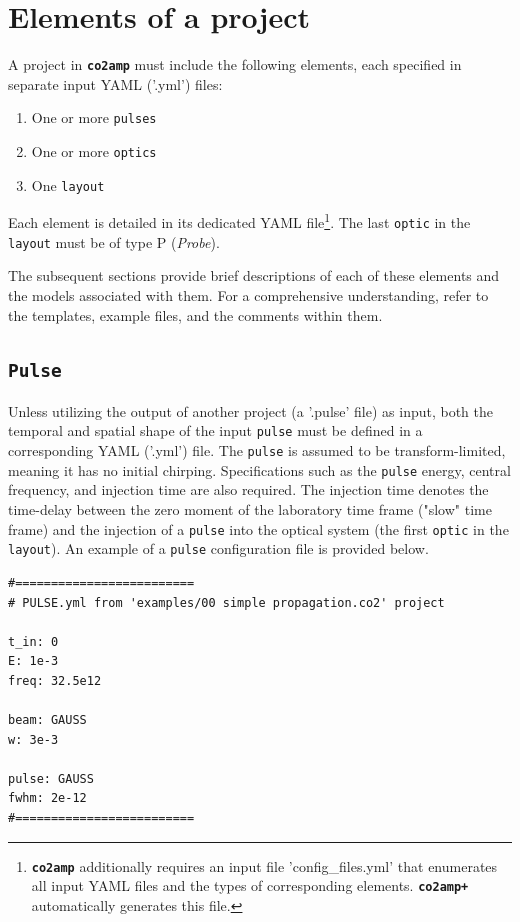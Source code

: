 \chapter{Elements of a project}

A project in \textbf{\texttt{co2amp}} must include the following elements, each specified in separate input YAML ('.yml') files:
\begin{enumerate}
    \item One or more \texttt{pulses}
    \item One or more \texttt{optics}
    \item One \texttt{layout}
\end{enumerate}
Each element is detailed in its dedicated YAML file\footnote{\textbf{\texttt{co2amp}} additionally requires an input file 'config\_files.yml' that enumerates all input YAML files and the types of corresponding elements. \textbf{\texttt{co2amp+}} automatically generates this file.}. The last \texttt{optic} in the \texttt{layout} must be of type P (\textit{Probe}).

The subsequent sections provide brief descriptions of each of these elements and the models associated with them. For a comprehensive understanding, refer to the templates, example files, and the comments within them.


\section{\texttt{Pulse}}
Unless utilizing the output of another project (a '.pulse' file) as input, both the temporal and spatial shape of the input \texttt{pulse} must be defined in a corresponding YAML ('.yml') file. The \texttt{pulse} is assumed to be transform-limited, meaning it has no initial chirping. Specifications such as the \texttt{pulse} energy, central frequency, and injection time are also required. The injection time denotes the time-delay between the zero moment of the laboratory time frame ("slow" time frame) and the injection of a \texttt{pulse} into the optical system (the first \texttt{optic} in the \texttt{layout}). An example of a \texttt{pulse} configuration file is provided below.

\begin{verbatim}
#=========================
# PULSE.yml from 'examples/00 simple propagation.co2' project

t_in: 0
E: 1e-3
freq: 32.5e12

beam: GAUSS
w: 3e-3

pulse: GAUSS
fwhm: 2e-12
#=========================
\end{verbatim}

